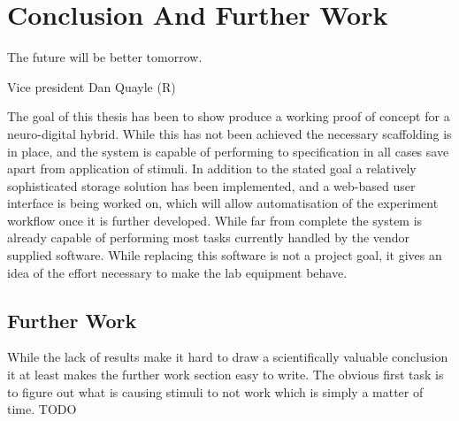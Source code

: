 \chapter{Conclusion And Further Work}
\epigraph{The future will be better tomorrow.}{Vice president Dan Quayle (R)}
The goal of this thesis has been to show produce a working proof of concept for
a neuro-digital hybrid.
While this has not been achieved the necessary scaffolding is in place, and the
system is capable of performing to specification in all cases save apart from
application of stimuli.
In addition to the stated goal a relatively sophisticated storage solution has
been implemented, and a web-based user interface is being worked on, which will
allow automatisation of the experiment workflow once it is further developed.
While far from complete the system is already capable of performing most tasks
currently handled by the vendor supplied software.
While replacing this software is not a project goal, it gives an idea of the
effort necessary to make the lab equipment behave.
\section{Further Work}
While the lack of results make it hard to draw a scientifically valuable
conclusion it at least makes the further work section easy to write.
The obvious first task is to figure out what is causing stimuli to not work
which is simply a matter of time.
TODO
